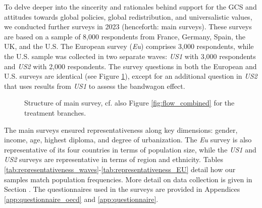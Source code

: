 \begin{bibunit}

To delve deeper into the sincerity and rationales behind support for the GCS and attitudes towards global policies, global redistribution, and universalistic values, we conducted further surveys  in 2023 (henceforth: main surveys). These surveys are based on a sample of 8,000 respondents from France, Germany, Spain, the UK, and the U.S. The European survey (\textit{Eu}) comprises 3,000 respondents, while the U.S. sample was collected in two separate waves: \textit{US1} with 3,000 respondents and \textit{US2} with 2,000 respondents. The survey questions in both the European and U.S. surveys are identical (see Figure \ref{fig:flow_simple}), except for an additional question in \textit{US2} that uses results from \textit{US1} to assess the bandwagon effect.


\begin{figure}[h!]
  \caption[Main surveys' structure]{Structure of main survey, cf. also Figure \ref{fig:flow_combined} for the treatment branches.}\label{fig:flow_simple}
\end{figure}


The main surveys ensured representativeness along key dimensions: gender, income, age, highest diploma, and degree of urbanization. The \textit{Eu} survey is also representative of its four countries in terms of population size, while the \textit{US1} and \textit{US2} surveys are representative in terms of region and ethnicity. 
Tables \ref{tab:representativeness_waves}-\ref{tab:representativeness_EU} detail how our samples match population frequencies. 
More detail on data collection is given in Section . The questionnaires used in the surveys are provided in Appendices \ref{app:questionnaire_oecd} and \ref{app:questionnaire}.




\end{bibunit}
